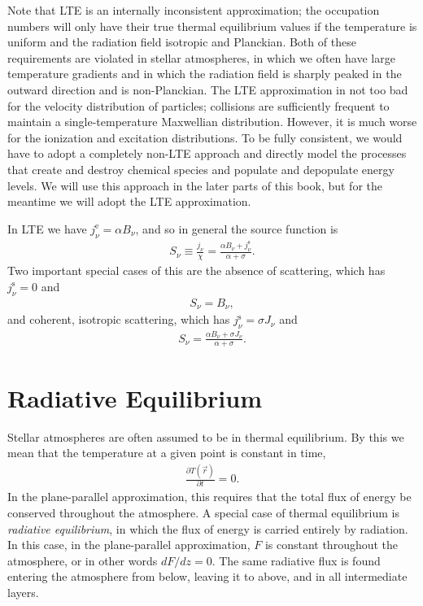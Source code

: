 Note that LTE is an internally inconsistent approximation;
the occupation numbers will only have their true thermal
equilibrium values if the temperature is uniform and the
radiation field isotropic and Planckian. Both of these
requirements are violated in stellar atmospheres, in which
we often have large temperature gradients and in which the
radiation field is sharply peaked in the outward direction
and is non-Planckian. The LTE approximation in not too bad
for the velocity distribution of particles; collisions are
sufficiently frequent to maintain a single-temperature
Maxwellian distribution. However, it is much worse for the
ionization and excitation distributions. To be fully consistent, we would
have to adopt a completely non-LTE approach and directly
model the processes that create and destroy chemical species
and populate and depopulate energy levels. We will use this
approach in the later parts of this book, but for the
meantime we will adopt the LTE approximation.

In LTE we have $j_\nu^\mathrm{e} = \alpha B_\nu$, and so in general
the source function is 
\begin{align}
S_\nu \equiv \frac{j_\nu}{\chi} = \frac{\alpha B_\nu + j_\nu^\mathrm{s}}{\alpha + \sigma}.
\end{align}
Two important special cases of this are the absence of scattering, which
has $j_\nu^\mathrm{s} = 0$ and
\begin{align}
S_\nu = B_\nu,
\end{align}
and coherent, isotropic scattering, which has $j_\nu^\mathrm{s} =
\sigma J_\nu$ and 
\begin{align}
S_\nu = \frac{\alpha B_\nu + \sigma J_\nu}{\alpha +
\sigma}.
\label{equation-lte-and-coherent-and-isotropic-scattering}
\end{align}

\section{Radiative Equilibrium}

Stellar atmospheres are often assumed to be in
thermal equilibrium. By this we mean that the temperature at a given point is constant in time,
\begin{align}
\frac{\partial T(\vec r)}{\partial t} = 0.
\end{align}
In the plane-parallel approximation, this requires
that the total flux of energy be conserved throughout the atmosphere. A
special case of thermal equilibrium is \emph{radiative equilibrium}, in
which the flux of energy is carried entirely by radiation. In this case, in the
plane-parallel approximation, $F$ is constant throughout the atmosphere,
or in other words $dF/dz = 0$. The same radiative flux is found
entering the atmosphere from below, leaving it to above, and in all
intermediate layers.

